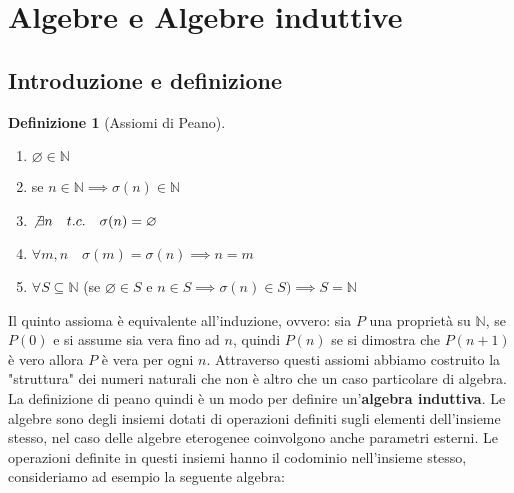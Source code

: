 \documentclass{article}
\theoremstyle{definition}
\theoremstyle{definition}
\theoremstyle{definition}
\newtheorem{definition}[theorem]{Definizione}
\theoremstyle{remark}
\begin{document}
\section{Algebre e Algebre induttive}
\subsection{Introduzione e definizione}
\begin{definition}[Assiomi di Peano]
    \leavevmode\newline
    \begin{enumerate}
        \renewcommand{\labelenumi}{\Roman{enumi}.}
        \item $\varnothing  \in \mathbb{N}$
        \item  se $n\in\mathbb{N}\implies \sigma(n)\in\mathbb{N}$
        \item $\not\exists n\quad t.c.\quad \sigma(n)= \varnothing$
        \item $\forall m,n \quad \sigma(m)=\sigma(n)\implies n = m$
        \item $\forall S\subseteq \mathbb{N}$ (se $\varnothing \in S$ e $n\in S \implies \sigma(n)\in S)\implies S=\mathbb{N}$
    \end{enumerate}
\end{definition}
Il quinto assioma è equivalente all'induzione, ovvero: sia $P$ una proprietà su $\mathbb{N}$, se $P(0)$ e si assume sia vera fino ad $n$, quindi
$P(n)$ se si dimostra che $P(n+1)$ è vero allora $P$ è vera per ogni $n$. Attraverso questi assiomi abbiamo costruito la "struttura" dei numeri naturali che non è altro che un caso particolare di algebra.
La definizione di peano quindi è un modo per definire un'\textbf{algebra induttiva}. Le algebre sono degli insiemi dotati di operazioni
definiti sugli elementi dell'insieme stesso, nel caso delle algebre eterogenee coinvolgono anche parametri esterni. Le operazioni definite in questi insiemi
hanno il codominio nell'insieme stesso, consideriamo ad esempio la seguente algebra:
\end{document}
